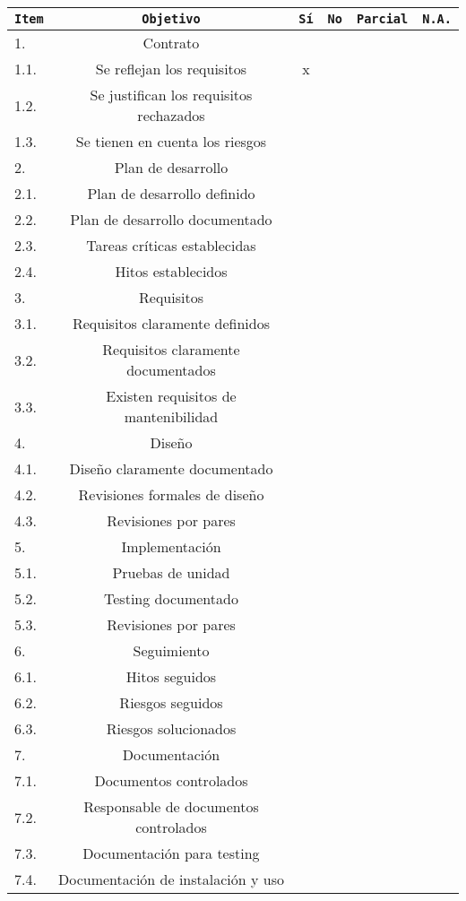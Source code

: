 \begin{center}
\begin{tabular}{|l|c|c|c|c|c|}
\hline
\texttt{Item} & \texttt{Objetivo} & \texttt{S\'i} & \texttt{No} & \texttt{Parcial} &
\texttt{N.A.}\\
\hline
\rowcolor{Gray}
1. & Contrato &&&&\\
\hline
1.1. & Se reflejan los requisitos &x&&&\\
\hline
1.2. & Se justifican los requisitos rechazados &&&&\\
\hline
1.3. & Se tienen en cuenta los riesgos &&&&\\
\hline
\rowcolor{Gray}
2. & Plan de desarrollo &&&&\\
\hline
2.1. & Plan de desarrollo definido &&&&\\
\hline
2.2. & Plan de desarrollo documentado &&&&\\
\hline
2.3. & Tareas cr\'iticas establecidas &&&&\\
\hline
2.4. & Hitos establecidos &&&&\\
\hline
\rowcolor{Gray}
3. & Requisitos &&&&\\
\hline
3.1. & Requisitos claramente definidos &&&&\\
\hline
3.2. & Requisitos claramente documentados &&&&\\
\hline
3.3. & Existen requisitos de mantenibilidad &&&&\\
\hline
\rowcolor{Gray}
4. & Dise\~no &&&&\\
\hline
4.1. & Dise\~no claramente documentado &&&&\\
\hline
4.2. & Revisiones formales de dise\~no &&&&\\
\hline
4.3. & Revisiones por pares &&&&\\
\hline
\rowcolor{Gray}
5. & Implementaci\'on &&&&\\
\hline
5.1. & Pruebas de unidad &&&&\\
\hline
5.2. & Testing documentado &&&&\\
\hline
5.3. & Revisiones por pares &&&&\\
\hline
\rowcolor{Gray}
6. & Seguimiento &&&&\\
\hline
6.1. & Hitos seguidos &&&&\\
\hline
6.2. & Riesgos seguidos &&&&\\
\hline
6.3. & Riesgos solucionados &&&&\\
\hline
\rowcolor{Gray}
7. & Documentaci\'on &&&&\\
\hline
7.1. & Documentos controlados &&&&\\
\hline
7.2. & Responsable de documentos controlados &&&&\\
\hline
7.3. & Documentaci\'on para testing &&&&\\
\hline
7.4. & Documentaci\'on de instalaci\'on y uso &&&&\\
\hline
\end{tabular}
\end{center}


